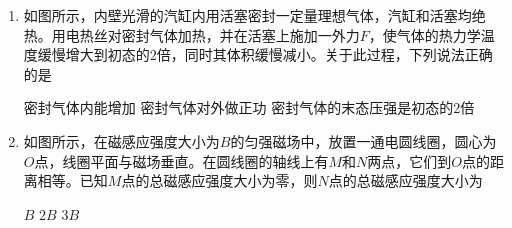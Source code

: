\documentclass[\gkver]{gaokaozhenti}
\begin{document}
\begin{enumerate}
{	因 $r_\text{甲} < r_\text{乙}$，可知卫星甲、乙运动的周期 $T_\text{甲} < T_\text{乙}$，线速度关系 $v_\text{甲} > v_\text{乙}$，角速度关系 $\omega_\text{甲} > \omega_\text{乙}$，向心加速度关系 $a_\text{甲} < a_\text{乙}$。

	故选 A。
}

\item 
如图所示，内壁光滑的汽缸内用活塞密封一定量理想气体，汽缸和活塞均绝热。用电热丝对密封气体加热，并在活塞上施加一外力$F$，使气体的热力学温度缓慢增大到初态的$2$倍，同时其体积缓慢减小。关于此过程，下列说法正确的是  




{密封气体内能增加}
{密封气体对外做正功}
{密封气体的末态压强是初态的$2$倍}



\item 
如图所示，在磁感应强度大小为$ B $的匀强磁场中，放置一通电圆线圈，圆心为$ O $点，线圈平面与磁场垂直。在圆线圈的轴线上有$ M $和$ N $两点，它们到$ O $点的距离相等。已知$ M $点的总磁感应强度大小为零，则$ N $点的总磁感应强度大小为



{$B$}
{$2B$}
{$3B$}


\end{enumerate}
\end{document}
